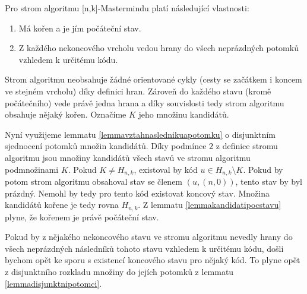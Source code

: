 \begin{tvrz}\label{tvrzvlastnostistromualgoritmu}
    Pro strom algoritmu [n,k]-Mastermindu platí následující vlastnosti:
    \begin{enumerate}
        \item Má kořen a je jím počáteční stav. 
        \item Z každého nekoncového vrcholu vedou hrany do všech neprázdných potomků vzhledem k určitému kódu.
    \end{enumerate}
    
\end{tvrz}
\begin{dukaz}
    Strom algoritmu neobsahuje žádné orientované cykly (cesty se začátkem i koncem ve stejném vrcholu) díky definici hran.
    Zároveň do každého stavu (kromě počátečního) vede právě jedna hrana a díky souvislosti tedy strom algoritmu obsahuje nějaký kořen. Označíme $K$ jeho množinu kandidátů.

    Nyní využijeme lemmatu \ref{lemmavztahnaslednikuapotomku} o disjunktním sjednocení potomků množin kandidátů. Díky podmínce $2$ z definice stromu algoritmu jsou množiny kandidátů všech stavů ve stromu algoritmu podmnožinami $K$. Pokud $K \neq H_{n,k}$, existoval by kód $u \in H_{n,k} \setminus K$. Pokud by potom strom algoritmu obsahoval stav se členem $(u, (n,0))$, tento stav by byl prázdný. Nemohl by tedy pro tento kód existovat koncový stav. Množina kandidátů kořene je tedy rovna $H_{n,k}$. Z lemmatu \ref{lemmakandidatipocstavu} plyne, že kořenem je právě počáteční stav. 

    Pokud by z nějakého nekoncového stavu ve stromu algoritmu nevedly hrany do všech neprázdných následníků tohoto stavu vzhledem k určitému kódu, došli bychom opět 
    ke sporu s existencí koncového stavu pro nějaký kód. To plyne opět z disjunktního rozkladu množiny do jejích potomků z lemmatu \ref{lemmadisjunktnipotomci}.
    
    

\end{dukaz}

